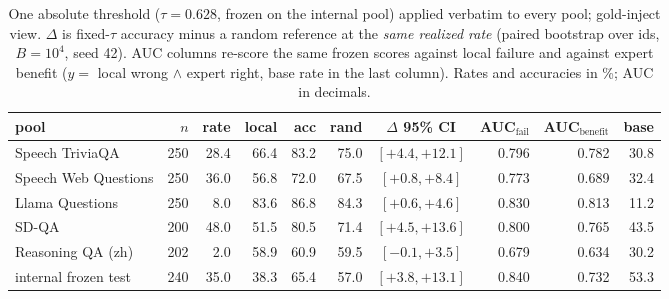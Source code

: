 \begin{table}[h]
\centering\footnotesize
\setlength{\tabcolsep}{4pt}
\caption{One absolute threshold ($\tau{=}0.628$, frozen on the internal
pool) applied verbatim to every pool; gold-inject view. $\Delta$ is
fixed-$\tau$ accuracy minus a random reference at the \emph{same
realized rate} (paired bootstrap over ids, $B{=}10^4$, seed 42). AUC
columns re-score the same frozen scores against local failure and
against expert benefit ($y{=}$ local wrong $\wedge$ expert right, base
rate in the last column). Rates and accuracies in \%; AUC in
decimals.}
\label{tab:fixedthr}
\begin{tabular}{lrrrrrcrrr}
\toprule
pool & $n$ & rate & local & acc & rand & $\Delta$ 95\% CI & AUC$_{\text{fail}}$ & AUC$_{\text{benefit}}$ & base \\
\midrule
Speech TriviaQA & 250 & 28.4 & 66.4 & 83.2 & 75.0 & $[+4.4,+12.1]$ & 0.796 & 0.782 & 30.8 \\
Speech Web Questions & 250 & 36.0 & 56.8 & 72.0 & 67.5 & $[+0.8,+8.4]$ & 0.773 & 0.689 & 32.4 \\
Llama Questions & 250 & 8.0 & 83.6 & 86.8 & 84.3 & $[+0.6,+4.6]$ & 0.830 & 0.813 & 11.2 \\
SD-QA & 200 & 48.0 & 51.5 & 80.5 & 71.4 & $[+4.5,+13.6]$ & 0.800 & 0.765 & 43.5 \\
Reasoning QA (zh) & 202 & 2.0 & 58.9 & 60.9 & 59.5 & $[-0.1,+3.5]$ & 0.679 & 0.634 & 30.2 \\
\midrule
internal frozen test & 240 & 35.0 & 38.3 & 65.4 & 57.0 & $[+3.8,+13.1]$ & 0.840 & 0.732 & 53.3 \\
\bottomrule
\end{tabular}
\end{table}

